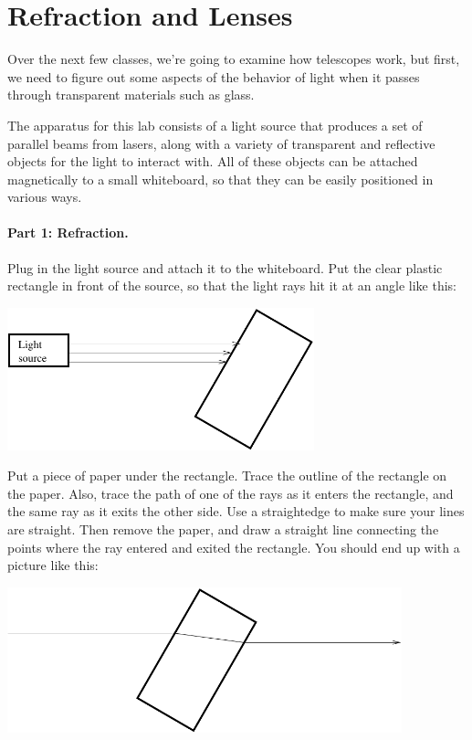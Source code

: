 \section{Refraction and Lenses}

\makelabheader 

Over the next few classes, we're going to examine how telescopes work,
but first, we need to figure out some aspects of the behavior of light
when it passes through transparent materials such as glass.

The apparatus for this lab consists of a light source that produces a set
of parallel beams from lasers, along with a variety of transparent and
reflective objects for the light to interact with.  All of these objects
can be attached magnetically to a small whiteboard, so that they can be
easily positioned in various ways.

\paragraph{Part 1: Refraction.}
Plug in the light source and attach it to the whiteboard.  Put
the clear plastic rectangle in front of the source, so that
the light rays hit it at an angle like this:

\answerspace{0.1in}
\centerline{\includegraphics[width=3.5in]{lenses1/lensfig1.pdf}}


Put a piece of paper under the rectangle.  Trace the outline of the rectangle
on the paper.  Also, trace the path of one of the rays as it enters
the rectangle, and the same ray as it exits the other side.  Use
a straightedge to make sure your lines are straight.
Then remove the paper, and draw a straight line connecting the points
where the ray entered and exited the rectangle. 
You should end up
with a picture like this:

\answerspace{0.1in}
\centerline{\includegraphics[width=4.5in]{lenses1/lensfig2.pdf}}



